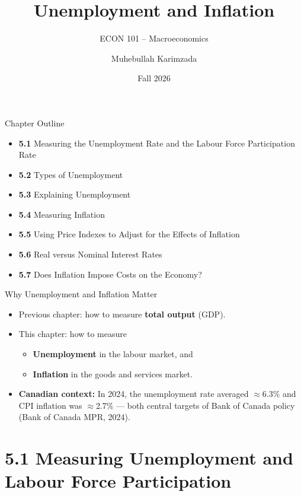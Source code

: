 \documentclass[aspectratio=169]{beamer}
\title{\textbf{Unemployment and Inflation}}
\subtitle{{\large ECON 101 -- Macroeconomics}}
\author{Muhebullah Karimzada}
\date{Fall 2026}
\begin{document}

\begin{frame}[plain]
  \titlepage
\end{frame}

\begin{frame}{Chapter Outline}
\transfade
\begin{itemize}[<+->]
  \item \textbf{5.1} Measuring the Unemployment Rate and the Labour Force Participation Rate
  \item \textbf{5.2} Types of Unemployment
  \item \textbf{5.3} Explaining Unemployment
  \item \textbf{5.4} Measuring Inflation
  \item \textbf{5.5} Using Price Indexes to Adjust for the Effects of Inflation
  \item \textbf{5.6} Real versus Nominal Interest Rates
  \item \textbf{5.7} Does Inflation Impose Costs on the Economy?
\end{itemize}
\end{frame}

\begin{frame}{Why Unemployment and Inflation Matter}
\transfade
\begin{itemize}[<+->]
  \item Previous chapter: how to measure \textbf{total output} (GDP).
  \item This chapter: how to measure
  \begin{itemize}[<+->]
    \item \textbf{Unemployment} in the labour market, and
    \item \textbf{Inflation} in the goods and services market.
  \end{itemize}
  \item \textbf{Canadian context:} In 2024, the unemployment rate averaged $\approx$6.3\% and CPI inflation was $\approx$2.7\% --- both central targets of Bank of Canada policy (Bank of Canada MPR, 2024).
\end{itemize}
\end{frame}

\section{5.1 Measuring Unemployment and Labour Force Participation}
\end{document}
